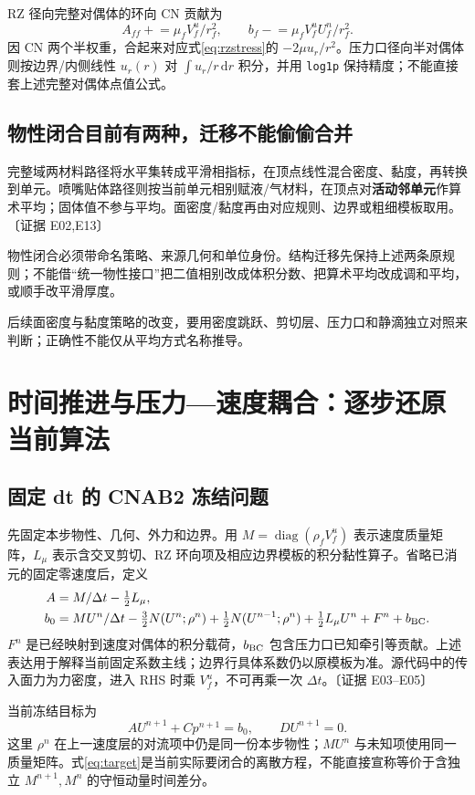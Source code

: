 \documentclass[UTF8,a4paper,11pt,fontset=fandol]{ctexart}
\newcommand{\code}[1]{\nolinkurl{#1}}
\newcommand{\ev}[1]{{\small\color{muted}〔证据 #1〕}}
\newcommand{\decision}[1]{\par\medskip\noindent\colorbox{pale}{\parbox{\dimexpr\linewidth-2\fboxsep}{\strut #1\strut}}\par\medskip}
\newcommand{\dd}{\,\mathrm d}\newcommand{\uu}{\bm u}\newcommand{\nn}{\bm n}
\newcommand{\dt}{\Delta t}\newcommand{\jump}[1]{[\![#1]\!]}
\begin{document}
RZ 径向完整对偶体的环向 CN 贡献为
\[
 A_{ff}\mathrel{+}=\mu_fV_f^u/r_f^2,\qquad
 b_f\mathrel{-}=\mu_fV_f^uU_f^n/r_f^2.
\]
因 CN 两个半权重，合起来对应式\eqref{eq:rzstress}的 $-2\mu u_r/r^2$。压力口径向半对偶体则按边界/内侧线性 $u_r(r)$ 对 $\int u_r/r\dd r$ 积分，并用 \code{log1p} 保持精度；不能直接套上述完整对偶体点值公式。

\subsection{物性闭合目前有两种，迁移不能偷偷合并}
完整域两材料路径将水平集转成平滑相指标，在顶点线性混合密度、黏度，再转换到单元。喷嘴贴体路径则按当前单元相别赋液/气材料，在顶点对\textbf{活动邻单元}作算术平均；固体值不参与平均。面密度/黏度再由对应规则、边界或粗细模板取用。\ev{E02,E13}

\decision{物性闭合必须带命名策略、来源几何和单位身份。结构迁移先保持上述两条原规则；不能借“统一物性接口”把二值相别改成体积分数、把算术平均改成调和平均，或顺手改平滑厚度。}
后续面密度与黏度策略的改变，要用密度跳跃、剪切层、压力口和静滴独立对照来判断；正确性不能仅从平均方式名称推导。

\section{时间推进与压力—速度耦合：逐步还原当前算法}
\subsection{固定 dt 的 CNAB2 冻结问题}
先固定本步物性、几何、外力和边界。用 $M=\operatorname{diag}(\rho_fV_f^u)$ 表示速度质量矩阵，$L_\mu$ 表示含交叉剪切、RZ 环向项及相应边界模板的积分黏性算子。省略已消元的固定零速度后，定义
\begin{align}
 A&=M/\dt-\tfrac12L_\mu,\label{eq:A}\\
 b_0&=M U^n/\dt-\tfrac32N(U^n;\rho^n)
       +\tfrac12N(U^{n-1};\rho^n)
       +\tfrac12L_\mu U^n+F^n+b_{\rm BC}.\label{eq:b}
\end{align}
$F^n$ 是已经映射到速度对偶体的积分载荷，$b_{\rm BC}$ 包含压力口已知牵引等贡献。上述表达用于解释当前固定系数主线；边界行具体系数仍以原模板为准。源代码中的传入面力为力密度，进入 RHS 时乘 $V_f^u$，不可再乘一次 $\dt$。\ev{E03--E05}

当前冻结目标为
\begin{equation}
 AU^{n+1}+Cp^{n+1}=b_0,\qquad DU^{n+1}=0.
 \label{eq:target}
\end{equation}
这里 $\rho^n$ 在上一速度层的对流项中仍是同一份本步物性；$M U^n$ 与未知项使用同一质量矩阵。式\eqref{eq:target}是当前实际要闭合的离散方程，不能直接宣称等价于含独立 $M^{n+1},M^n$ 的守恒动量时间差分。
\end{document}
